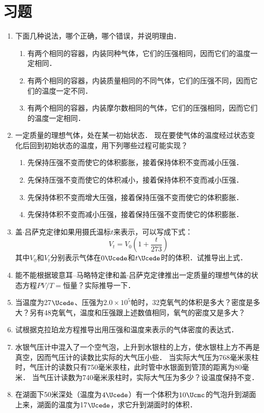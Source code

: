 \section*{习题}
\begin{enumerate}
    \item 下面几种说法，哪个正确，哪个错误，并说明理由．
    \begin{enumerate}
        \item 有两个相同的容器，内装同种气体，它们的压强相同，因而它们的温度一定相同．
        \item 有两个相同的容器，内装质量相同的不同气体，它们的压强不同，因而它们的温度一定不同．
        \item 有两个相同的容器，内装摩尔数相同的气体，它们的压强相同，因而它们的温度一定相同．
    \end{enumerate}
\item 一定质量的理想气体，处在某一初始状态．
现在要使气体的温度经过状态变化后回到初始状态的温度，用下列哪些过程可能实现？
\begin{enumerate}
    \item 先保持压强不变而使它的体积膨胀，接着保持体积不变而减小压强．
\item 先保持压强不变而使它的体积减小，接着保持体积不变而减小压强．
\item 先保持体积不变而增大压强，接着保持压强不变而使它的体积膨胀．
\item 先保持体积不变而减小压强，接着保持压强不变而使它的体积膨胀．     
\end{enumerate}
\item 盖$\cdot$吕萨克定律如果用摄氏温标$t$来表示，可以写成下式：
\[V_t=V_0\left(1+\frac{t}{273}\right) \]
其中$V_0$和$V_t$分别表示气体在$0 \Ucede$和$t \Ucede$时的体积．试推导出上式．
\item 能不能根据玻意耳--马略特定律和盖$\cdot$吕萨克定律推出一定质量的理想气体的状态方程$PV/T=$恒量？实际推导一下．
\item 当温度为27$\Ucede$、压强为$2.0\times 10^5$帕时，32克氧气的体积是多大？密度是多大？另有48克氧气，温度和压强跟上述数值相同，氧气的密度又是多大？    
\item   试根据克拉珀龙方程推导出用压强和温度来表示的气体密度的表达式．
\item  水银气压计中混入了一个空气泡，上升到水银柱的上方，使水银柱上方不再是真空，因而气压计的读数比实际的大气压小些．
当实际大气压为768毫米汞柱时，气压计的读数只有750毫米汞柱，此时管中水银面到管顶的距离为80毫米．
当气压计读数为740毫米汞柱时，实际大气压为多少？设温度保持不变．
\item  在湖面下50米深处（温度为$4 \Ucede$）有一个体积为$10 \Ucmc$的气泡升到湖面上来，湖面的温度为17$\Ucede$，求它升到湖面时的体积．

\end{enumerate}
